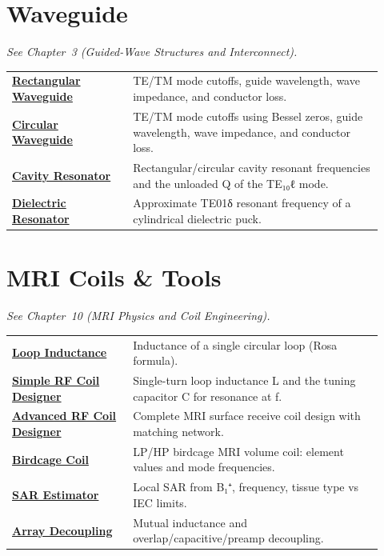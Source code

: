 \section*{Waveguide}
\noindent\emph{See Chapter~3 (Guided-Wave Structures and Interconnect).}
\begin{longtable}{>{\raggedright\arraybackslash}p{0.30\linewidth}>{\raggedright\arraybackslash}p{0.62\linewidth}}
\hline
\href{https://rftoolbox.ca/Waveguide.html}{\textbf{Rectangular Waveguide}} & TE/TM mode cutoffs, guide wavelength, wave impedance, and conductor loss. \\
\href{https://rftoolbox.ca/CircularWaveguide.html}{\textbf{Circular Waveguide}} & TE/TM mode cutoffs using Bessel zeros, guide wavelength, wave impedance, and conductor loss. \\
\href{https://rftoolbox.ca/CavityResonator.html}{\textbf{Cavity Resonator}} & Rectangular/circular cavity resonant frequencies and the unloaded Q of the TE₁₀ℓ mode. \\
\href{https://rftoolbox.ca/DielectricResonator.html}{\textbf{Dielectric Resonator}} & Approximate TE01δ resonant frequency of a cylindrical dielectric puck. \\
\hline
\end{longtable}

\section*{MRI Coils \& Tools}
\noindent\emph{See Chapter~10 (MRI Physics and Coil Engineering).}
\begin{longtable}{>{\raggedright\arraybackslash}p{0.30\linewidth}>{\raggedright\arraybackslash}p{0.62\linewidth}}
\hline
\href{https://rftoolbox.ca/CLI.html}{\textbf{Loop Inductance}} & Inductance of a single circular loop (Rosa formula). \\
\href{https://rftoolbox.ca/CoilDesigner.html}{\textbf{Simple RF Coil Designer}} & Single-turn loop inductance L and the tuning capacitor C for resonance at f. \\
\href{https://rftoolbox.ca/SurfaceCoilDesigner.html}{\textbf{Advanced RF Coil Designer}} & Complete MRI surface receive coil design with matching network. \\
\href{https://rftoolbox.ca/BirdcageCoil.html}{\textbf{Birdcage Coil}} & LP/HP birdcage MRI volume coil: element values and mode frequencies. \\
\href{https://rftoolbox.ca/SAREstimator.html}{\textbf{SAR Estimator}} & Local SAR from B₁⁺, frequency, tissue type vs IEC limits. \\
\href{https://rftoolbox.ca/PhasedArrayDecoupling.html}{\textbf{Array Decoupling}} & Mutual inductance and overlap/capacitive/preamp decoupling. \\
\hline
\end{longtable}

